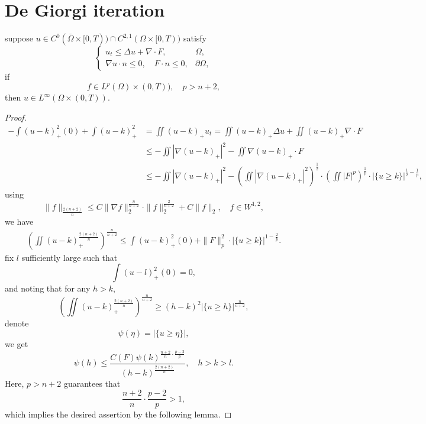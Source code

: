 \section{De Giorgi iteration}

\begin{lemma}
	suppose $u\in C^0(\overline{\Omega}\times[0,T))\cap C^{2,1}(\Omega\times[0,T))$ satisfy 
\begin{equation*}
	\begin{cases}
		u_t \leq \Delta u + \nabla\cdot F, & \Omega,\\
		\nabla u\cdot n \leq 0, \quad F\cdot n \leq 0, & \partial\Omega,
	\end{cases}
\end{equation*}
if 
\[
	f\in L^p(\Omega)\times(0,T)),\quad p>n+2,
\]
then
$u\in L^\infty(\Omega\times(0,T))$.
\end{lemma}

\begin{proof}
	\begin{align*}
		-\int(u-k)_+^2(0) + \int (u-k)_+^2
		&= \iint (u-k)_+u_t = \iint (u-k)_+\Delta u + \iint(u-k)_+\nabla\cdot F\\
		&\leq - \iint |\nabla(u-k)_+|^2 - \iint \nabla(u-k)_+\cdot F\\
		&\leq - \iint |\nabla(u-k)_+|^2 
			- \left(\iint |\nabla(u-k)_+|^2\right)^{\frac12}
			\cdot\left(\iint |F|^p\right)^{\frac1p}
			\cdot |\{u\geq k\}|^{\frac{1}{2}-\frac1p},
	\end{align*}
using 
\[
	\|f\|_{\frac{2(n+2)}{n}}\leq C\|\nabla f\|_2^{\frac{n}{n+2}}\cdot\|f\|_2^{\frac{2}{n+2}} 
		+ C\|f\|_2,	\quad f\in W^{1,2},
\]
we have
\begin{align*}
	\left(\iint (u-k)_+^{\frac{2(n+2)}{n}}\right)^{\frac{n}{n+2}}
	\leq \int(u-k)_+^2(0) + \|F\|_p^2\cdot|\{u\geq k\}|^{1-\frac2p}.
\end{align*}
fix $l$ sufficiently large such that 
\[
	\int (u-l)_+^2(0) = 0,
\]
and noting that for any $h>k$,
\[
	\left(\iint (u-k)_+^{\frac{2(n+2)}{n}}\right)^{\frac{n}{n+2}}
	\geq (h-k)^2|\{u\geq h\}|^{\frac{n}{n+2}},
\]
denote 
\[
	\psi(\eta) = |\{u\geq \eta\}|,
\]
we get
\[
	\psi(h) \leq \frac{C(F)\psi(k)^{\frac{n+2}{n}\cdot\frac{p-2}{p}}}{(h-k)^{\frac{2(n+2)}{n}}},
	\quad h>k>l.
\]
Here, $p>n+2$ guarantees that 
\[
	\frac{n+2}{n}\cdot\frac{p-2}{p} > 1,
\]
which implies the desired assertion by the following lemma.
\end{proof}

